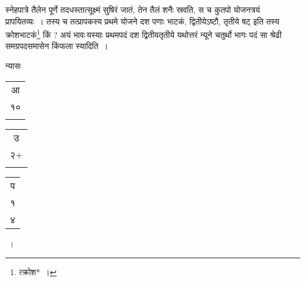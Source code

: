\documentclass[10pt, openany]{book}
\begin{document}
{{{\newpage

{स्नेहपात्रे तैलेन पूर्णे तदधस्तात्सूक्ष्मं सुषिरं जातं, तेन तैलं शनैः
स्रवति, स च कुतपो}
{योजनत्रयं प्रापयितव्यः~। तस्य च तत्प्रापकस्य प्रथमे योजने दश पणाः
भाटकं, द्वितीयेऽष्टौ,}
{तृतीये षट् इति तस्य क्रोशभाटकं\renewcommand{\thefootnote}{१}\footnote{त्क्रोश*~।} किं ? अयं भावः\textendash \,यस्याः प्रथमपदं दश
द्वितीयतृतीये}
{यथोत्तरं न्यूने चतुर्थो भागः पदं सा श्रेढी समग्रपदसमासेन किंफला
स्यादिति~।}
\vspace{3mm}

{न्यासः\textendash \hspace{2mm} \begin{tabular}{|c|}आ \\ १०\\ \\\end{tabular}
\begin{tabular}{c|} उ \\ २$+$ \\ \\\end{tabular}
\begin{tabular}{c|}  प \\  १ \\४\end{tabular}~। 
\vspace{3mm}

}}}}
\end{document}
